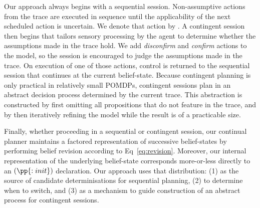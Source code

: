 \documentclass{article}
\begin{document}
Our approach always begins with a sequential session. Non-assumptive
actions from the trace are executed in sequence until the
applicability of the next scheduled action is uncertain. We denote
that action by \switchAction.  A contingent session then begins that
tailors sensory processing by the agent to determine whether the
assumptions made in the trace hold. 
We add {\em disconfirm} and {\em confirm} actions to the model, so
the session is encouraged to judge the assumptions made in the
trace. On execution of one of those actions, control is returned to
the sequential session that continues at the current%
belief-state.
Because contingent planning is only practical in relatively small
POMDPs, contingent sessions plan in an abstract decision process
determined by the current trace. This abstraction is constructed by
first omitting all propositions that do not feature in the trace, and
by then iteratively refining the model while the result is of a
practicable size.

Finally, whether proceeding in a sequential or contingent session, our
continual planner maintains a factored representation of successive
belief-states by performing belief revision according to
Eq~\ref{eq:revision}. Moreover, our internal representation of the
underlying belief-state corresponds more-or-less directly to an
$(\pp{:init})$ declaration. Our approach uses that distribution: (1)
as the source of candidate determinisations for sequential planning,
(2) to determine when to switch, and (3) as a mechanism to guide
construction of an abstract process for contingent sessions.


\end{document}
